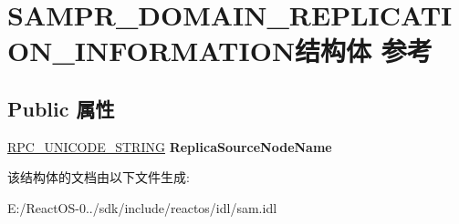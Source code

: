 \hypertarget{struct_s_a_m_p_r___d_o_m_a_i_n___r_e_p_l_i_c_a_t_i_o_n___i_n_f_o_r_m_a_t_i_o_n}{}\section{S\+A\+M\+P\+R\+\_\+\+D\+O\+M\+A\+I\+N\+\_\+\+R\+E\+P\+L\+I\+C\+A\+T\+I\+O\+N\+\_\+\+I\+N\+F\+O\+R\+M\+A\+T\+I\+O\+N结构体 参考}
\label{struct_s_a_m_p_r___d_o_m_a_i_n___r_e_p_l_i_c_a_t_i_o_n___i_n_f_o_r_m_a_t_i_o_n}
\subsection*{Public 属性}
\begin{DoxyCompactItemize}
\item 
\mbox{\label{struct_s_a_m_p_r___d_o_m_a_i_n___r_e_p_l_i_c_a_t_i_o_n___i_n_f_o_r_m_a_t_i_o_n_ac29e0bf8b4701204083574afee2e47de}} 
\hyperlink{struct___r_p_c___u_n_i_c_o_d_e___s_t_r_i_n_g}{R\+P\+C\+\_\+\+U\+N\+I\+C\+O\+D\+E\+\_\+\+S\+T\+R\+I\+NG} {\bfseries Replica\+Source\+Node\+Name}
\end{DoxyCompactItemize}


该结构体的文档由以下文件生成\+:\begin{DoxyCompactItemize}
\item 
E\+:/\+React\+O\+S-\/0../sdk/include/reactos/idl/sam.\+idl\end{DoxyCompactItemize}
